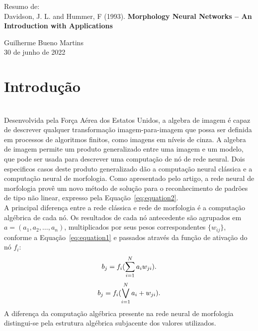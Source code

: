 \documentclass[12pt]{article}
\begin{document}
    \LARGE
    \centering
    Resumo de:\\ Davidson, J. L. and Hummer, F (1993). \textbf{Morphology Neural Networks – An Introduction with Applications}\\
    \vspace{0.25in}

    \large
    Guilherme Bueno Martins\\
    30 de junho de 2022\\
    \vspace{0.5in}
    \justifying


    \section{Introdução} \label{ch:introducao}\\
    Desenvolvida pela Força Aérea dos Estatos Unidos, a algebra de imagem é capaz de descrever qualquer transformação imagem-para-imagem que possa ser definida em processos de algoritmos finitos, como imagens em níveis de cinza.
    A algebra de imagem permite um produto generalizado entre uma imagem e um modelo, que pode ser usada para descrever uma computação de nó de rede neural.
    Dois especificos casos deste produto generalizado dão a computação neural clássica e a computação neural de morfologia.
    Como apresentado pelo artigo, a rede neural de morfologia provê um novo método de solução para o reconhecimento de padrões de tipo não linear, expresso pela Equação~\ref{eq:equation2}.\\
    A principal diferença entre a rede clássica e rede de morfologia é a computação algébrica de cada nó.
    Os resultados de cada nó antecedente são agrupados em $a = (a_1, a_2, \dots, a_n)$, multiplicados por seus pesos correspondentes $\{w_{ij}\}$, conforme a Equação~\ref{eq:equation1} e passados através da função de ativação do nó $f_i$:\\
    \begin{equation}
        b_j = f_i (\sum_{i=1}^{N} a_i w_{ji}).\\\label{eq:equation1}
    \end{equation}
    \begin{equation}
        b_j = f_i (\bigvee_{i=1}^{N} a_i + w_{ji}).\\\label{eq:equation2}
    \end{equation}
    A diferença da computação algébrica presente na rede neural de morfologia distingui-se pela estrutura algébrica subjacente dos valores utilizados.
\end{document}
